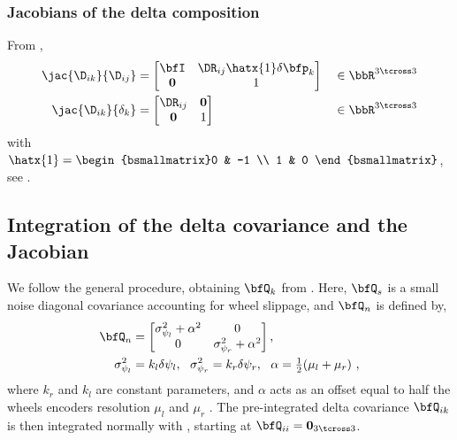 \subsubsection{Jacobians of the delta composition}
%
From , %
%
\begin{subequations}\label{equ:jac_composition_DD}
\begin{align}
\jac{\D_{ik}}{\D_{ij}} &= \begin{bmatrix}
\bfI & \DR_{ij}\hatx{1}\delta\bfp_k \\
\bf0 & 1
\end{bmatrix}
&&\in \bbR^{3\tcross3}
\\
\jac{\D_{ik}}{\delta_k} &= \begin{bmatrix}
\DR_{ij} & \bf0 \\
\bf0        & 1
\end{bmatrix}
&&\in \bbR^{3\tcross3}
\end{align}
\end{subequations}
%
with $\hatx{1}=\begin{bsmallmatrix}0 & -1 \\ 1 & 0
\end{bsmallmatrix}$, see .
%

\subsection{Integration of the delta covariance and the Jacobian}

We follow the general procedure, obtaining $\bfQ_k$ from .
Here, $\bfQ_s$ is a small noise diagonal covariance accounting for wheel slippage, and $\bfQ_n$ is defined by, 
%
\begin{align}
\label{equ:diff_drive_meas_cov}
\bfQ_n &=
\begin{bmatrix}
\sigma^2_{\psi_l}+\alpha^2 & 0\\
0 & \sigma^2_{\psi_r}+\alpha^2
\end{bmatrix}, \\
\sigma_{\psi_l}^2&=k_l \delta\psi_l,~~\sigma_{\psi_r}^2=k_r \delta\psi_r,~~\alpha=\tfrac12(\mu_l+\mu_r)  \notag
~,
\end{align}
%
where $k_r$ and $k_l$ are constant parameters,
and $\alpha$ acts as an offset equal to half the wheels encoders resolution $\mu_l$ and $\mu_r$
\cite{siegwart2011introduction}.
The pre-integrated delta covariance $\bfQ_{ik}$ is then integrated normally with , starting at $\bfQ_{ii}={\bf0}_{3\tcross3}$.

